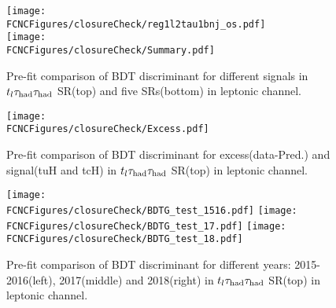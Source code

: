 \begin{figure}[H]
\centering
\texttt{[image: \\FCNCFigures/closureCheck/reg1l2tau1bnj\_os.pdf]}\\
\texttt{[image: \\FCNCFigures/closureCheck/Summary.pdf]}
\caption{Pre-fit comparison of BDT discriminant for different signals in $t_l\tau_\text{had}{}\tau_\text{had}$ SR(top) and five SRs(bottom) in leptonic channel.}
\label{fig:overlay_signal_closure}
\end{figure}

\begin{figure}[H]
\centering
\texttt{[image: \\FCNCFigures/closureCheck/Excess.pdf]}\\
\caption{Pre-fit comparison of BDT discriminant for excess(data-Pred.) and signal(tuH and tcH) in $t_l\tau_\text{had}{}\tau_\text{had}$ SR(top) in leptonic channel.}
\label{fig:excess_com}
\end{figure}



\begin{figure}[H]
\centering
\texttt{[image: \\FCNCFigures/closureCheck/BDTG\_test\_1516.pdf]}
\texttt{[image: \\FCNCFigures/closureCheck/BDTG\_test\_17.pdf]}
\texttt{[image: \\FCNCFigures/closureCheck/BDTG\_test\_18.pdf]}
\caption{Pre-fit comparison of BDT discriminant for different years: 2015-2016(left), 2017(middle) and 2018(right) in $t_l\tau_\text{had}{}\tau_\text{had}$ SR(top) in leptonic channel.}
\label{fig:different_year_com}
\end{figure}



